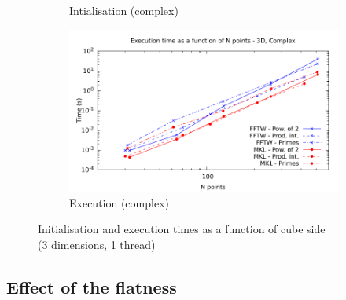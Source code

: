 \documentclass[12pt, a4paper]{article}
\begin{document}
\begin{figure}[H]
\begin{subfigure}{.5\textwidth}
\caption{Intialisation (complex)}
\label{3DCI}
\end{subfigure}%
\begin{subfigure}{.5\textwidth}
\centering
\includegraphics[width=.9\linewidth]{graphs/3d-exec-c.pdf}
\caption{Execution (complex)}
\label{3DC}
\end{subfigure}
\caption{Initialisation and execution times as a function of cube side\\(3 dimensions, 1 thread)}
\label{3D}
\end{figure}
\subsection{Effect of the flatness}\label{FLATNESS}
\end{document}
